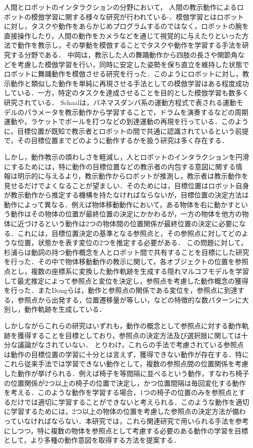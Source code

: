人間とロボットのインタラクションの分野において，
人間の教示動作によるロボットの模倣学習に関する様々な研究が行われている\cite{imitation1}-\cite{imitation4}．模倣学習とはロボットに対し，タスクや動作をあらかじめプログラムするのではなく，ロボットの腕を直接操作したり，人間の動作をカメラなどを通じて視覚的に与えたりといった方法で動作を教示し，その挙動を模倣することでタスクや動作を学習する手法を研究する分野である．
中岡\cite{nakaoka}は，教示した人の舞踊動作から四肢の長さや関節角などを考慮した模倣学習を行い，同時に安定した姿勢を保ち直立を維持した状態でロボットに舞踊動作を模倣させる研究を行った．このようにロボットに対し，教示動作と類似した動作を単純に再現させる手法としての模倣学習はある程度成功している．一方，特定のタスクを達成させることを目的とした模倣学習も数多く研究されている．
Schaal\cite{schaal}は，バネマスダンパ系の運動方程式で表される運動モデルのパラメータを教示動作から学習することで，ドラムを演奏するなどの周期運動や，ラケットでボールを打つなどの到達運動の再現を行っている．このように，目標位置が既知で教示者とロボットの間で共通に認識されているという前提で，その目標位置までどのように動作するかを扱う研究は多く存在する．

しかし，動作教示の煩わしさを軽減し，人とロボットのインタラクションを円滑にするためには，特に動作の目標位置などの教示者の内包する意図に関する情報は明示的に与えるより，教示動作からロボットが推測し，教示者は教示動作を見せるだけでよくなることが望ましい．そのためには，目標位置はロボット自身が教示動作から推定する機構を持たなければならないが，目標位置の決定方法は動作によって異なる．例えば物体移動動作において，ある物体を右に動かすという動作はその物体の位置が最終位置の決定にかかわるが，一方の物体を他方の物体に近づけるという動作は2つの物体間の位置関係が最終位置の決定に必要になる．これには，目標位置決定の基準となる参照点と，その参照点に対してどのような位置，状態かを表す変位の2つを推定する必要がある．
この問題に対して，杉浦ら\cite{sugiura}は動詞の持つ動作概念を人とロボット間で共有することを目標にした研究を行った．その中で物体移動動作の教示に関して，各オブジェクトの位置を参照点とし，複数の座標系に変換した動作軌跡を生成する隠れマルコフモデルを学習して最尤推定によって参照点と変位を決定し，参照点を考慮した動作概念の獲得を行った．またDongら\cite{dong}は，動作と参照点の関係である変位を，参照点に到達する，参照点から出発する，位置遷移量が等しい，などの特徴的な数パターンに大別し，動作軌跡を生成している．

しかしながらこれらの研究はいずれも，動作の概念として参照点に対する動作軌跡を獲得することを目標としており，参照点の決定方法及び選択肢に関しては十分な議論がなされていない．
とりわけ，これらの手法で考慮されている参照点は動作の目標位置の学習に十分とは言えず，獲得できない動作が存在する．特にこれら従来手法では学習できない動作として，複数の参照点間の位置関係を考慮した動作が挙げられる．例えば椅子を等間隔に並べるという動作，すなわち椅子の位置関係が2つ以上の椅子の位置で決定し，かつ位置間隔は毎回変化する動作を考える．このような動作を学習する場合，1つの椅子の位置のみを参照点とするだけでは適切に学習することができないと考えられる．このような動作を適切に学習するためには，2つ以上の物体の位置を考慮した参照点の決定方法が備わっていなければならない．本研究では，これら関連研究で用いられる手法を参考にしつつ，特に複数の物体を参照点として考慮する必要のある動作の学習を目標として，より多種の動作意図を取得する方法を提案する．        

